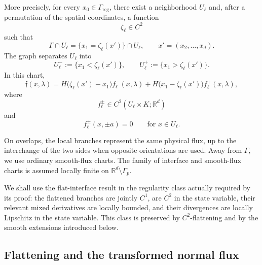\documentclass[11pt]{amsart}
\numberwithin{equation}{section}
\theoremstyle{plain}
\theoremstyle{definition}
\theoremstyle{remark}
\begin{document}
More precisely, for every \(x_0\in\Gamma_{\mathrm{reg}}\), there exist a
neighborhood \(U_\ell\) and, after a permutation of the spatial coordinates,
a function
\[
    \zeta_\ell\in C^2
\]
such that
\begin{equation}
\label{eq:general-local-graph}
    \Gamma\cap U_\ell
    =
    \{x_1=\zeta_\ell(x')\}\cap U_\ell,
    \qquad
    x'=(x_2,\ldots,x_d).
\end{equation}
The graph separates \(U_\ell\) into
\[
    U_\ell^-:=\{x_1<\zeta_\ell(x')\},
    \qquad
    U_\ell^+:=\{x_1>\zeta_\ell(x')\}.
\]
In this chart,
\begin{equation}
\label{eq:general-local-flux}
\mathfrak f(x,\lambda)
=
H\bigl(\zeta_\ell(x')-x_1\bigr)f_\ell^-(x,\lambda)
+
H\bigl(x_1-\zeta_\ell(x')\bigr)f_\ell^+(x,\lambda),
\end{equation}
where
\begin{equation}
\label{eq:general-branch-regularity}
    f_\ell^\pm
    \in
    C^2(U_\ell\times K;\mathbb R^d)
\end{equation}
and
\begin{equation}
\label{eq:general-invariant}
    f_\ell^\pm(x,\pm a)=0
    \qquad
    \text{for }x\in U_\ell.
\end{equation}

On overlaps, the local branches represent the same physical flux, up to the
interchange of the two sides when opposite orientations are used. Away from
\(\Gamma\), we use ordinary smooth-flux charts. The family of interface and
smooth-flux charts is assumed locally finite on
\(\mathbb R^d\setminus\Gamma_p\).

We shall use the flat-interface result in the regularity class actually
required by its proof: the flattened branches are jointly \(C^1\), are
\(C^2\) in the state variable, their relevant mixed derivatives are locally
bounded, and their divergences are locally Lipschitz in the state variable.
This class is preserved by \(C^2\)-flattening and by the smooth extensions
introduced below.

\subsection{Flattening and the transformed normal flux}
\label{subsec:general-flattening}
\end{document}
